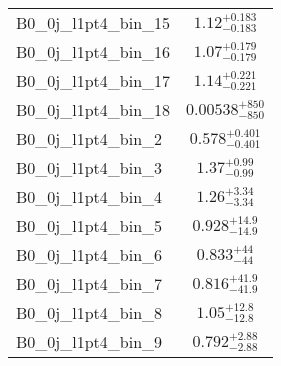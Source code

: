 \begin{tabular}{|l|c|}
B0\_0j\_l1pt4\_bin\_15 & $1.12^{+0.183}_{-0.183}$ \\
B0\_0j\_l1pt4\_bin\_16 & $1.07^{+0.179}_{-0.179}$ \\
B0\_0j\_l1pt4\_bin\_17 & $1.14^{+0.221}_{-0.221}$ \\
B0\_0j\_l1pt4\_bin\_18 & $0.00538^{+850}_{-850}$ \\
B0\_0j\_l1pt4\_bin\_2 & $0.578^{+0.401}_{-0.401}$ \\
B0\_0j\_l1pt4\_bin\_3 & $1.37^{+0.99}_{-0.99}$ \\
B0\_0j\_l1pt4\_bin\_4 & $1.26^{+3.34}_{-3.34}$ \\
B0\_0j\_l1pt4\_bin\_5 & $0.928^{+14.9}_{-14.9}$ \\
B0\_0j\_l1pt4\_bin\_6 & $0.833^{+44}_{-44}$ \\
B0\_0j\_l1pt4\_bin\_7 & $0.816^{+41.9}_{-41.9}$ \\
B0\_0j\_l1pt4\_bin\_8 & $1.05^{+12.8}_{-12.8}$ \\
B0\_0j\_l1pt4\_bin\_9 & $0.792^{+2.88}_{-2.88}$ \\
\hline
\end{tabular}
